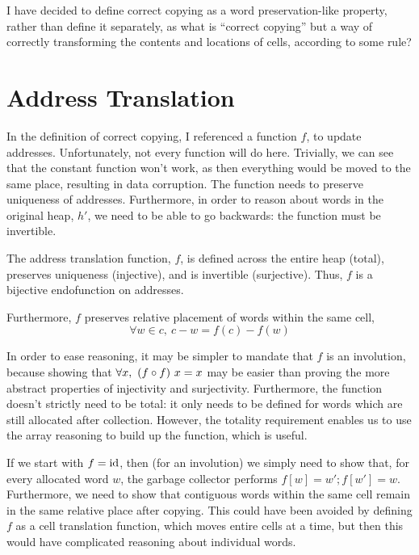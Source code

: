 I have decided to define correct copying as a word preservation-like
property, rather than define it separately, as what is ``correct
copying'' but a way of correctly transforming the contents and
locations of cells, according to some rule?

\section{Address Translation}
\label{sec:copying-address}

In the definition of correct copying, I referenced a function $f$, to
update addresses. Unfortunately, not every function will do
here. Trivially, we can see that the constant function won't work, as
then everything would be moved to the same place, resulting in data
corruption. The function needs to preserve uniqueness of
addresses. Furthermore, in order to reason about words in the original
heap, $h'$, we need to be able to go backwards: the function must be
invertible.

\begin{definition}
  \label{def:c-address-translation-function}
  The address translation function, $f$, is defined across the entire
  heap (total), preserves uniqueness (injective), and is invertible
  (surjective). Thus, $f$ is a bijective endofunction on addresses.

  Furthermore, $f$ preserves relative placement of words within the
  same cell, \[\forall w \in c,\ c - w = f(c) - f(w)\]
\end{definition}

In order to ease reasoning, it may be simpler to mandate that $f$ is
an involution, because showing that $\forall x,\ (f \circ f)~x = x$ may
be easier than proving the more abstract properties of injectivity and
surjectivity. Furthermore, the function doesn't strictly need to be
total: it only needs to be defined for words which are still allocated
after collection. However, the totality requirement enables us to use
the array reasoning to build up the function, which is useful.

If we start with $f = \mathrm{id}$, then (for an involution) we simply need to
show that, for every allocated word $w$, the garbage collector
performs $f[w] = w'; f[w'] = w$. Furthermore, we need to show that
contiguous words within the same cell remain in the same relative
place after copying. This could have been avoided by defining $f$ as a
cell translation function, which moves entire cells at a time, but
then this would have complicated reasoning about individual words.

